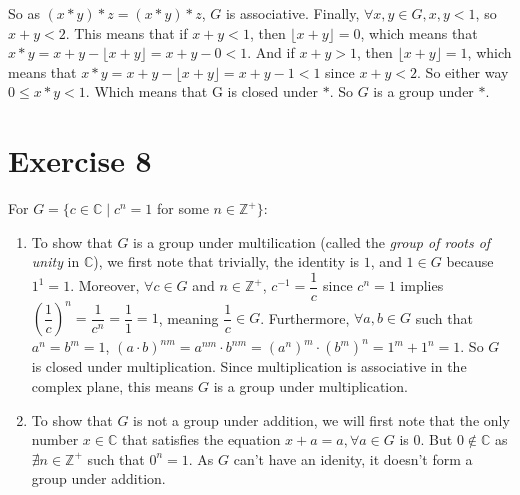 \documentclass[12pt]{article}
\newcommand{\Z}{\mathbb{Z}}
\newcommand{\C}{\mathbb{C}}
\begin{document}
    So as $(x \ast y) \ast z = (x \ast y) \ast z$,
    $G$ is associative.
    Finally, $\forall x, y \in G, x, y < 1$,
    so $x + y < 2$.
    This means that if $x + y < 1$,
    then  $\lfloor x + y \rfloor = 0$,
    which means that $x \ast y = x + y - \lfloor x + y \rfloor = x + y - 0 < 1$.
    And if $x + y > 1$,
    then $\lfloor x + y \rfloor = 1$,
    which means that $x \ast y = x + y - \lfloor x + y \rfloor = x + y - 1 < 1$
    since $x + y < 2$.
    So either way $0 \leqslant x \ast y < 1$.
    Which means that G is closed under $\ast$.
    So $G$ is a group under $\ast$.

    
    \section*{Exercise 8}
    For $G = \{c \in \C \mid c^{n} = 1$ for some $n \in \Z^{+}\}$:
    \begin{enumerate}[label=\textbf{\alph*.}]
        \item 
            To show that $G$ is a group under multilication
            (called the \textit{group of roots of unity} in $\C$),
            we first note that trivially, the identity is $1$,
            and $1 \in G$ because $1^{1} = 1$.
            Moreover, $\forall c \in G$ and $n \in \Z^{+}$,
            $c^{-1} = \dfrac{1}{c}$
            since $c^{n} = 1$
            implies $(\dfrac{1}{c})^{n} = \dfrac{1}{c^{n}} = \dfrac{1}{1} = 1$,
            meaning $\dfrac{1}{c} \in G$.
            Furthermore, $\forall a, b \in G$
            such that $a^{n} = b^{m} = 1$,
            $(a \cdot b)^{nm}
            = a^{nm} \cdot b^{nm}
            = (a^{n})^{m} \cdot (b^{m})^{n}
            = 1^{m} + 1^{n}
            = 1$.
            So $G$ is closed under multiplication.
            Since multiplication is associative in the complex plane,
            this means $G$ is a group under multiplication.
        \item 
            To show that $G$ is not a group under addition,
            we will first note that the only number $x \in \C$
            that satisfies the equation $x + a = a, \forall a \in G$ is $0$.
            But $0 \notin \C$
            as $\nexists n \in \Z^{+}$
            such that $0^n = 1$.
            As $G$ can't have an idenity,
            it doesn't form a group under addition. 
    \end{enumerate}
\end{document}
